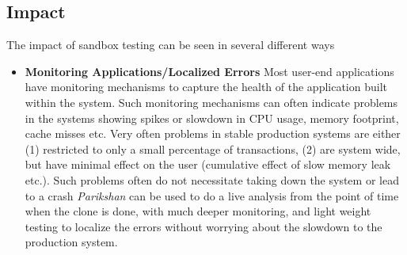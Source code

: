 \subsection{Impact}
\label{sec:impact}

The impact of sandbox testing can be seen in several different ways

\begin{itemize}

  \item \textbf{Monitoring Applications/Localized Errors}
Most user-end applications have monitoring mechanisms to capture the health of the application built within the system.
Such monitoring mechanisms can often indicate problems in the systems showing spikes or slowdown in CPU usage, memory footprint, cache misses etc.
Very often problems in stable production systems are either (1) restricted to only a small percentage of transactions, (2) are system wide, but have minimal effect on the user (cumulative effect of slow memory leak etc.).
Such problems often do not necessitate taking down the system or lead to a crash
\textit{Parikshan} can be used to do a live analysis from the point of time when the clone is done, with much deeper monitoring, and light weight testing to localize the errors without worrying about the slowdown to the production system.


\end{itemize}
